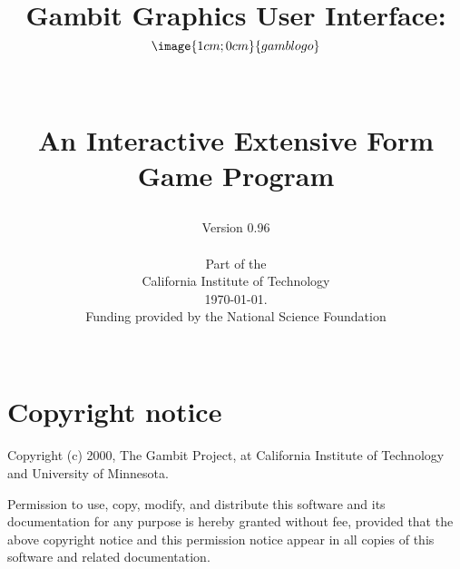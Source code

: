 %
%
%
%

\parskip=10pt%
\parindent=0pt%
\itemsep{0pt}
\title{Gambit Graphics User Interface:\\
$$\image{1cm;0cm}{gamblogo}$$\\
\centerline{An Interactive Extensive Form Game Program}}
\author{Version 0.96\\
 \\
Part of the \\
California Institute of Technology\\ \today.\\
Funding provided by the National Science Foundation\\
 \\}

\makeindex%
%
\maketitle%


\tableofcontents%

\chapter*{Copyright notice}%

Copyright (c) 2000, The Gambit Project, at California Institute of
Technology and University of Minnesota.

Permission to use, copy, modify, and distribute this software and its
documentation for any purpose is hereby granted without fee, provided
that the above copyright notice and this permission notice appear in
all copies of this software and related documentation.


